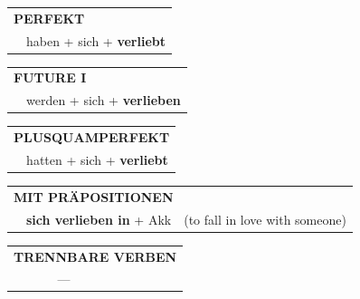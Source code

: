 \documentclass[10pt,a4paper]{revtex4-2}
\begin{document}
\begin{verbbox}
 \begin{tabular}{rl}
     \multicolumn{2}{l}{\textbf{PERFEKT}}\\
    &haben + sich + \textbf{verliebt}\\
  \end{tabular}
\hfill
   \begin{tabular}{rl}
   
    \multicolumn{2}{l}{\textbf{FUTURE I} }\\
    &werden + sich + \textbf{verlieben}\\
 
  \end{tabular}
\hfill
   \begin{tabular}{rl}
      \multicolumn{2}{l}{\textbf{PLUSQUAMPERFEKT}}\\
    &hatten + sich + \textbf{verliebt}\\
  \end{tabular}
  
\vspace{10pt}

   \begin{tabular}{lll}
      \multicolumn{3}{l}{\textbf{MIT PRÄPOSITIONEN}}\\
& \textbf{sich verlieben in} + Akk & (to fall in love with someone)
  \end{tabular}
  \hfill
   \begin{tabular}{lll}
     \multicolumn{3}{l}{\textbf{TRENNBARE VERBEN}}\\
& --- & \\
 \end{tabular}
  
  \vspace{-5pt}

\end{verbbox}
\end{document}
